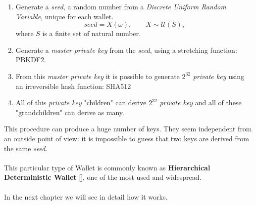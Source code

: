 \begin{enumerate}[label=(\roman*)]
	\item Generate a \textit{seed}, a random number from a \textit{Discrete Uniform Random Variable}, unique for each wallet.
	\begin{equation*}
	seed=X(\omega), \qquad X\sim \mathcal{U}(S),
	\end{equation*}
	where $S$ is a finite set of natural number.
	\item Generate a \textit{master private key} from the \textit{seed}, using a stretching function: PBKDF2.
	\item From this \textit{master private key} it is possible to generate $2^{32}$ \textit{private key} using an irreversible hash function: SHA512
	\item All of this \textit{private key} "children" can derive $2^{32}$ \textit{private key} and all of these "grandchildren" can derive as many.
\end{enumerate}
This procedure can produce a huge number of keys. They seem independent from an outside point of view: it is impossible to guess that two keys are derived from the same \textit{seed}.
\\ \\ 
This particular type of Wallet is commonly known as \textbf{Hierarchical Deterministic Wallet} [\cite{1}], one of the most used and widespread.
\\ \\
In the next chapter we will see in detail how it works.

